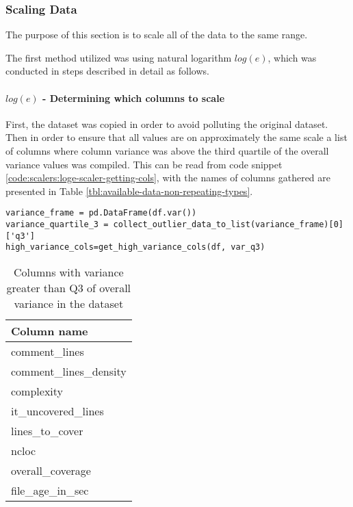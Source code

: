 \subsubsection{Scaling Data}
The purpose of this section is to scale all of the data to the same range. 

The first method utilized was using natural logarithm $log(e)$, which was conducted in steps described in detail as follows.
\paragraph{$log(e)$ - Determining which columns to scale}
First, the dataset was copied in order to avoid polluting the original dataset. Then in order to ensure that all values are on approximately the same scale a list of columns where column variance was above the third quartile of the overall variance values was compiled. This can be read from code snippet \ref{code:scalers:loge-scaler-getting-cols}, with the names of columns gathered are presented in Table \ref{tbl:available-data-non-repeating-types}.

\begin{code}
\label{code:scalers:loge-scaler-getting-cols}
\begin{verbatim}
variance_frame = pd.DataFrame(df.var())
variance_quartile_3 = collect_outlier_data_to_list(variance_frame)[0]['q3']
high_variance_cols=get_high_variance_cols(df, var_q3)
\end{verbatim}
\end{code}

\begin{table}[!h]
\centering
\caption{Columns with variance greater than Q3 of overall variance in the dataset}
\label{tab:loge-scaler-cols-aboveq3}
\begin{tabular}{@{}l@{}}
\toprule
Column name \\ \midrule
comment\_lines \\
comment\_lines\_density \\
complexity \\
it\_uncovered\_lines \\
lines\_to\_cover \\
ncloc \\
overall\_coverage \\
file\_age\_in\_sec \\ \bottomrule
\end{tabular}
\end{table}


